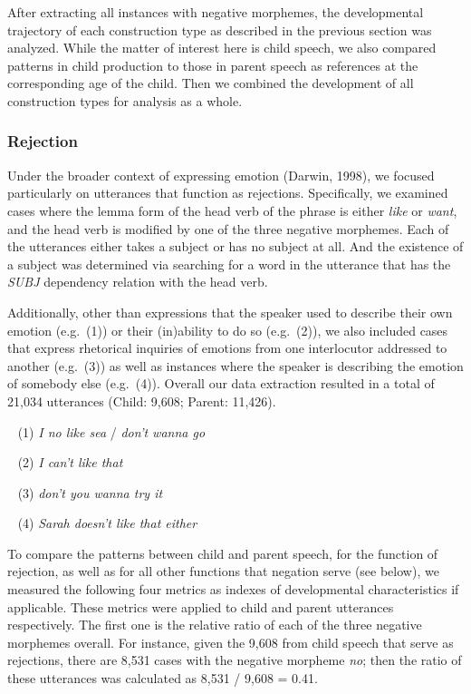 \documentclass[10pt, letterpaper]{article}
\begin{document}
After extracting all instances with negative morphemes, the
developmental trajectory of each construction type as described in the
previous section was analyzed. While the matter of interest here is
child speech, we also compared patterns in child production to those in
parent speech as references at the corresponding age of the child. Then
we combined the development of all construction types for analysis as a
whole.

\hypertarget{rejection}{%
\subsubsection{Rejection}\label{rejection}}

Under the broader context of expressing emotion (Darwin, 1998), we
focused particularly on utterances that function as rejections.
Specifically, we examined cases where the lemma form of the head verb of
the phrase is either \emph{like} or \emph{want}, and the head verb is
modified by one of the three negative morphemes. Each of the utterances
either takes a subject or has no subject at all. And the existence of a
subject was determined via searching for a word in the utterance that
has the \emph{SUBJ} dependency relation with the head verb.

Additionally, other than expressions that the speaker used to describe
their own emotion (e.g.~(1)) or their (in)ability to do so (e.g.~(2)),
we also included cases that express rhetorical inquiries of emotions
from one interlocutor addressed to another (e.g.~(3)) as well as
instances where the speaker is describing the emotion of somebody else
(e.g.~(4)). Overall our data extraction resulted in a total of 21,034
utterances (Child: 9,608; Parent: 11,426).

~ (1) \emph{I no like sea} / \emph{don't wanna go}

~ (2) \emph{I can't like that}

~ (3) \emph{don't you wanna try it}

~ (4) \emph{Sarah doesn't like that either}

To compare the patterns between child and parent speech, for the
function of rejection, as well as for all other functions that negation
serve (see below), we measured the following four metrics as indexes of
developmental characteristics if applicable. These metrics were applied
to child and parent utterances respectively. The first one is the
relative ratio of each of the three negative morphemes overall. For
instance, given the 9,608 from child speech that serve as rejections,
there are 8,531 cases with the negative morpheme \emph{no}; then the
ratio of these utterances was calculated as 8,531 / 9,608 = 0.41.
\end{document}
